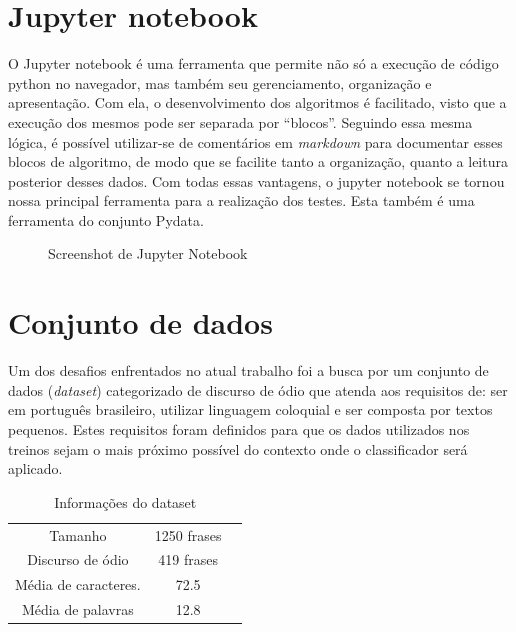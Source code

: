 \newpage

\section{Jupyter notebook}

O Jupyter notebook é uma ferramenta que permite não só a execução de código python no navegador, mas também seu gerenciamento, organização e apresentação. Com ela, o desenvolvimento dos algoritmos é facilitado, visto que a execução dos mesmos pode ser separada por “blocos”. Seguindo essa mesma lógica, é possível utilizar-se de comentários em \textit{markdown} para documentar esses blocos de algoritmo, de modo que se facilite tanto a organização, quanto a leitura posterior desses dados. Com todas essas vantagens, o jupyter notebook se tornou nossa principal ferramenta para a realização dos testes. Esta também é uma ferramenta do conjunto Pydata.

\begin{figure}[!htb]
    \label{fig:jupyter}
    \caption{Screenshot de Jupyter Notebook}
\end{figure}

\section{Conjunto de dados}
\label{sec:dataset}

Um dos desafios enfrentados no atual trabalho foi a busca por um conjunto de dados (\textit{dataset}) categorizado de discurso de ódio que atenda aos requisitos de: ser em português brasileiro, utilizar linguagem coloquial e ser composta por textos pequenos. Estes requisitos foram definidos para que os dados utilizados nos treinos sejam o mais próximo possível do contexto onde o classificador será aplicado.

\begin{center}
\begin{table}[h!]
\centering
\begin{tabular}{ |c|c|c| } 
 \hline
 Tamanho & 1250 frases \\ 
 Discurso de ódio & 419 frases  \\ 
 Média de caracteres. & 72.5  \\
 Média de palavras & 12.8 \\
 \hline
\end{tabular}
\caption{Informações do dataset}
\end{table}
\end{center}

